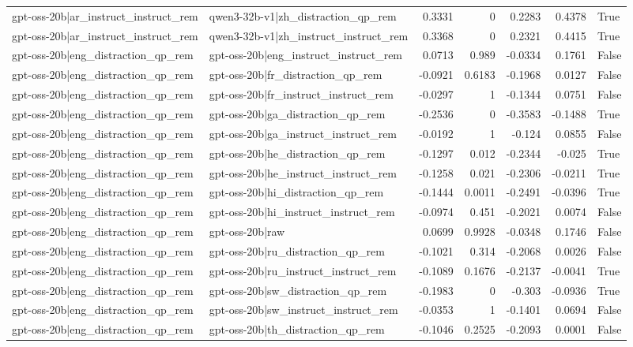 \begin{table}
\begin{tabular}{l l r r r r l}
gpt-oss-20b|ar_instruct_instruct_rem & qwen3-32b-v1|zh_distraction_qp_rem & 0.3331 & 0 & 0.2283 & 0.4378 & True \\
gpt-oss-20b|ar_instruct_instruct_rem & qwen3-32b-v1|zh_instruct_instruct_rem & 0.3368 & 0 & 0.2321 & 0.4415 & True \\
gpt-oss-20b|eng_distraction_qp_rem & gpt-oss-20b|eng_instruct_instruct_rem & 0.0713 & 0.989 & -0.0334 & 0.1761 & False \\
gpt-oss-20b|eng_distraction_qp_rem & gpt-oss-20b|fr_distraction_qp_rem & -0.0921 & 0.6183 & -0.1968 & 0.0127 & False \\
gpt-oss-20b|eng_distraction_qp_rem & gpt-oss-20b|fr_instruct_instruct_rem & -0.0297 & 1 & -0.1344 & 0.0751 & False \\
gpt-oss-20b|eng_distraction_qp_rem & gpt-oss-20b|ga_distraction_qp_rem & -0.2536 & 0 & -0.3583 & -0.1488 & True \\
gpt-oss-20b|eng_distraction_qp_rem & gpt-oss-20b|ga_instruct_instruct_rem & -0.0192 & 1 & -0.124 & 0.0855 & False \\
gpt-oss-20b|eng_distraction_qp_rem & gpt-oss-20b|he_distraction_qp_rem & -0.1297 & 0.012 & -0.2344 & -0.025 & True \\
gpt-oss-20b|eng_distraction_qp_rem & gpt-oss-20b|he_instruct_instruct_rem & -0.1258 & 0.021 & -0.2306 & -0.0211 & True \\
gpt-oss-20b|eng_distraction_qp_rem & gpt-oss-20b|hi_distraction_qp_rem & -0.1444 & 0.0011 & -0.2491 & -0.0396 & True \\
gpt-oss-20b|eng_distraction_qp_rem & gpt-oss-20b|hi_instruct_instruct_rem & -0.0974 & 0.451 & -0.2021 & 0.0074 & False \\
gpt-oss-20b|eng_distraction_qp_rem & gpt-oss-20b|raw & 0.0699 & 0.9928 & -0.0348 & 0.1746 & False \\
gpt-oss-20b|eng_distraction_qp_rem & gpt-oss-20b|ru_distraction_qp_rem & -0.1021 & 0.314 & -0.2068 & 0.0026 & False \\
gpt-oss-20b|eng_distraction_qp_rem & gpt-oss-20b|ru_instruct_instruct_rem & -0.1089 & 0.1676 & -0.2137 & -0.0041 & True \\
gpt-oss-20b|eng_distraction_qp_rem & gpt-oss-20b|sw_distraction_qp_rem & -0.1983 & 0 & -0.303 & -0.0936 & True \\
gpt-oss-20b|eng_distraction_qp_rem & gpt-oss-20b|sw_instruct_instruct_rem & -0.0353 & 1 & -0.1401 & 0.0694 & False \\
gpt-oss-20b|eng_distraction_qp_rem & gpt-oss-20b|th_distraction_qp_rem & -0.1046 & 0.2525 & -0.2093 & 0.0001 & False \\

\end{tabular}
\end{table}
